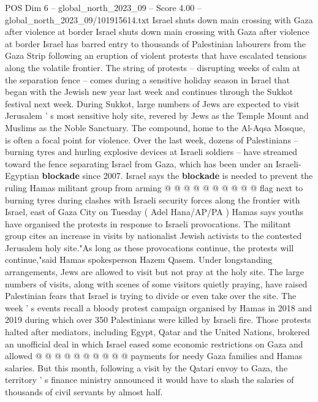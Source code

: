 \begin{textsample}{POS Dim 6 – global\_north\_2023\_09 – Score 4.00 – global\_north\_2023\_09/101915614.txt}  \label{ex:f6_pos_072}
Israel shuts down main crossing with Gaza after violence at border Israel shuts down main crossing with Gaza after violence at border Israel has barred entry to thousands of Palestinian labourers from the Gaza Strip following an eruption of violent protests that have escalated tensions along the volatile frontier.
The string of protests -- disrupting weeks of calm at the separation fence -- comes during a sensitive holiday season in Israel that began with the Jewish new year last week and continues through the Sukkot festival next week.
During Sukkot, large numbers of Jews are expected to visit Jerusalem ' s most sensitive holy site, revered by Jews as the Temple Mount and Muslims as the Noble Sanctuary.
The compound, home to the Al-Aqsa Mosque, is often a focal point for violence.
Over the last week, dozens of Palestinians -- burning tyres and hurling explosive devices at Israeli soldiers -- have streamed toward the fence separating Israel from Gaza, which has been under an Israeli-Egyptian \textbf{blockade} since 2007.
Israel says the \textbf{blockade} is needed to prevent the ruling Hamas militant group from arming @ @ @ @ @ @ @ @ @ @ flag next to burning tyres during clashes with Israeli security forces along the frontier with Israel, east of Gaza City on Tuesday ( Adel Hana/AP/PA ) Hamas says youths have organised the protests in response to Israeli provocations.
The militant group cites an increase in visits by nationalist Jewish activists to the contested Jerusalem holy site."As long as these provocations continue, the protests will continue,"said Hamas spokesperson Hazem Qasem.
Under longstanding arrangements, Jews are allowed to visit but not pray at the holy site.
The large numbers of visits, along with scenes of some visitors quietly praying, have raised Palestinian fears that Israel is trying to divide or even take over the site.
The week ' s events recall a bloody protest campaign organised by Hamas in 2018 and 2019 during which over 350 Palestinians were killed by Israeli fire.
Those protests halted after mediators, including Egypt, Qatar and the United Nations, brokered an unofficial deal in which Israel eased some economic restrictions on Gaza and allowed @ @ @ @ @ @ @ @ @ @ payments for needy Gaza families and Hamas salaries.
But this month, following a visit by the Qatari envoy to Gaza, the territory ' s finance ministry announced it would have to slash the salaries of thousands of civil servants by almost half.

\end{textsample}
